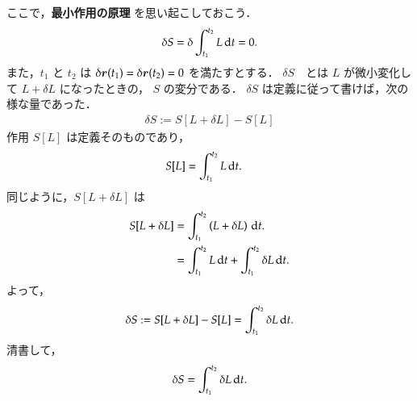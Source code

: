                 ここで，\textbf{最小作用の原理} を思い起こしておこう．
                    \begin{equation*}
                        \delta S = \delta \int_{t_{1}}^{t_{2}}L \,\mathrm{d} t = 0.
                    \end{equation*}
                また，$t_{1}$ と $t_{2}$ は $\delta \boldsymbol{r}(t_{1}) = \delta \boldsymbol{r}(t_{2})=0$ を満たすとする．
                    $\delta S$　とは $L$ が微小変化して $L+\delta L$ になったときの， $S$ の変分である．
                    $\delta S$ は定義に従って書けば，次の様な量であった．
                                        \begin{align*}
                                \delta S:=S[L+\delta L]-S[L]
                                        \end{align*}
                                作用 $S[L]$ は定義そのものであり，
                                \begin{align*}
                                        S[L]          &= \int_{t_{1}}^{t_{2}} L \,\mathrm{d} t.
                                \end{align*}
                                同じように，$S[L+\delta L]$ は
                                \begin{align*}
                                        S[L+\delta L] &=  \int_{t_{1}}^{t_{2}} \left(L + \delta L\right)\,\mathrm{d} t. \\
                                                                          &=  \int_{t_{1}}^{t_{2}} L \,\mathrm{d} t + \int_{t_{1}}^{t_{2}} \delta L \,\mathrm{d} t.
                                \end{align*}
                    よって，
                        \begin{align*}
                                \delta S := S[L+\delta L] - S[L] = \int_{t_{1}}^{t_{2}} \delta L \,\mathrm{d} t.
                        \end{align*}
                                清書して，
                        \begin{align}\label{eq:SetsudouH3}
                                \delta S = \int_{t_{1}}^{t_{2}} \delta L \df t.
                        \end{align}


